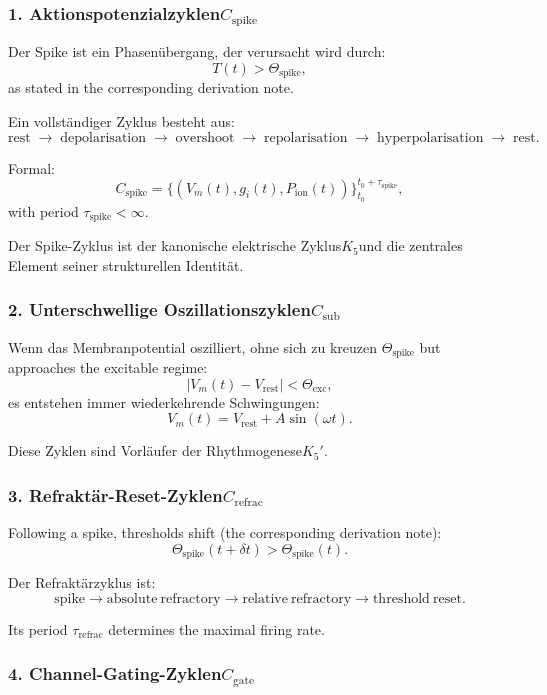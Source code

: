 \subsubsection{1. Aktionspotenzialzyklen$C_{\mathrm{spike}}$}

Der Spike ist ein Phasenübergang, der verursacht wird durch:
\[
  T(t) > \Theta_{\mathrm{spike}},
\]
as stated in the corresponding derivation note.

Ein vollständiger Zyklus besteht aus:
\[
  \mathrm{rest}
  \;\to\;
  \mathrm{depolarisation}
  \;\to\;
  \mathrm{overshoot}
  \;\to\;
  \mathrm{repolarisation}
  \;\to\;
  \mathrm{hyperpolarisation}
  \;\to\;
  \mathrm{rest}.
\]

Formal:
\[
  C_{\mathrm{spike}}
  =\{(V_m(t), g_i(t), P_{\mathrm{ion}}(t))\}_{t_0}^{t_0+\tau_{\mathrm{spike}}},
\]
with period $\tau_{\mathrm{spike}} < \infty$.

Der Spike-Zyklus ist der kanonische elektrische Zyklus$K_5$und die
zentrales Element seiner strukturellen Identität.

\subsubsection{2. Unterschwellige Oszillationszyklen$C_{\mathrm{sub}}$}

Wenn das Membranpotential oszilliert, ohne sich zu kreuzen
$\Theta_{\mathrm{spike}}$ but approaches the excitable regime:
\[
  |V_m(t) - V_{\mathrm{rest}}| < \Theta_{\mathrm{exc}},
\]
es entstehen immer wiederkehrende Schwingungen:
\[
  V_m(t) = V_{\mathrm{rest}} + A\sin(\omega t).
\]

Diese Zyklen sind Vorläufer der Rhythmogenese$K_5'$.

\subsubsection{3. Refraktär-Reset-Zyklen$C_{\mathrm{refrac}}$}

Following a spike, thresholds shift (the corresponding derivation note):
\[
  \Theta_{\mathrm{spike}}(t+\delta t)
  >
  \Theta_{\mathrm{spike}}(t).
\]

Der Refraktärzyklus ist:
\[
  \mathrm{spike}
  \to
  \mathrm{absolute\ refractory}
  \to
  \mathrm{relative\ refractory}
  \to
  \mathrm{threshold\ reset}.
\]

Its period $\tau_{\mathrm{refrac}}$ determines the maximal firing rate.

\subsubsection{4. Channel-Gating-Zyklen$C_{\mathrm{gate}}$}

